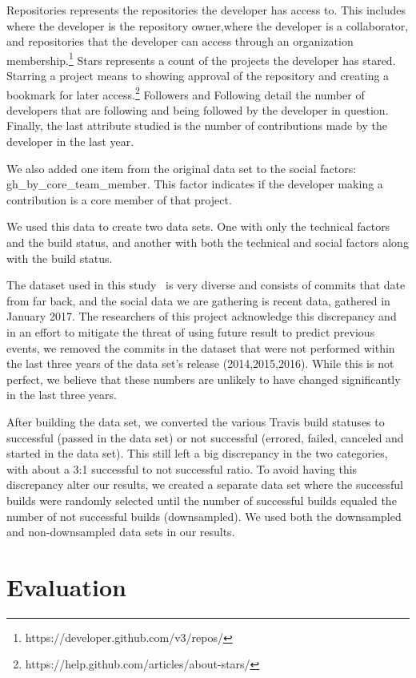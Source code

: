 \documentclass[10pt, conference]{IEEEtran}
\begin{document}
Repositories represents the repositories the developer has access to. This 
includes where the developer is the repository owner,where the developer is a 
collaborator, and repositories that the developer can access through an 
organization membership.\footnote{https://developer.github.com/v3/repos/} Stars 
represents a count of the projects the developer has stared. Starring  a project
means to showing approval of the repository and creating a bookmark for later 
access.\footnote{https://help.github.com/articles/about-stars/} Followers and 
Following detail the number of developers that are following and being followed 
by the developer in question. Finally, the last attribute studied is the number 
of contributions made by the developer in the last year. 

We also added one item from the original data set to the social factors:
gh\_by\_core\_team\_member.
This factor indicates if the developer making a contribution is a core member 
of that project.

We used this data to create two data sets.  One with only the technical
factors and the build status, and another with both the technical and social
factors along with the build status.

The dataset used in this study~\cite{msr17challenge} is very diverse 
and consists of commits that date from far back, and the social data we are 
gathering is recent data, gathered in January 2017. The researchers of this 
project acknowledge this discrepancy and in an effort to mitigate the threat of
using future result to predict previous events,
we removed the commits in the dataset that were not performed within the last
three years of the data set's release (2014,2015,2016).  While this is not
perfect, we believe that these numbers are unlikely to have changed
significantly in the last three years.

After building the data set, we converted the various Travis build statuses to
successful (passed in the data set) or not successful (errored, failed, canceled
and started in the data set).  This still left a big discrepancy in the two
categories, with about a 3:1 successful to not successful ratio. To avoid having
this discrepancy alter our results, we created a separate data set where the
successful builds were randomly selected until the number of successful builds
equaled the number of not successful builds (downsampled).  We used both the
downsampled and non-downsampled data sets in our results.


\section{Evaluation}
\end{document}
